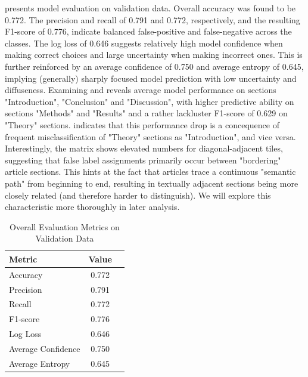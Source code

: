  presents model evaluation on validation data. Overall accuracy was found to be 0.772. The precision and recall of 0.791 and 0.772, respectively, and the resulting F1-score of 0.776, indicate balanced false-positive and false-negative across the classes. The log loss of 0.646 suggests relatively high model confidence when making correct choices and large uncertainty when making incorrect ones. This is further reinforced by an average confidence of 0.750 and average entropy of 0.645, implying (generally) sharply focused model prediction with low uncertainty and diffuseness. Examining  and  reveals average model performance on sections "Introduction", "Conclusion" and "Discussion", with higher predictive ability on sections "Methods" and "Results" and a rather lackluster F1-score of 0.629 on "Theory" sections.  indicates that this performance drop is a concequence of frequent misclassification of "Theory" sections as "Introduction", and vice versa. Interestingly, the matrix shows elevated numbers for diagonal-adjacent tiles, suggesting that false label assignments primarily occur between "bordering" article sections. This hints at the fact that articles trace a continuous "semantic path" from beginning to end, resulting in textually adjacent sections being more closely related (and therefore harder to distinguish). We will explore this characteristic more thoroughly in later analysis.

\begin{table}[ht]
\centering
\caption{Overall Evaluation Metrics on Validation Data}
\begin{tabular}{lcc}
\toprule
\textbf{Metric} & \textbf{Value} \\
\midrule
Accuracy               & 0.772 \\
Precision   & 0.791 \\
Recall      & 0.772 \\
F1-score    & 0.776 \\
Log Loss               & 0.646 \\
Average Confidence     & 0.750 \\
Average Entropy        & 0.645 \\
\bottomrule
\end{tabular}
\label{tab:103}
\end{table}

